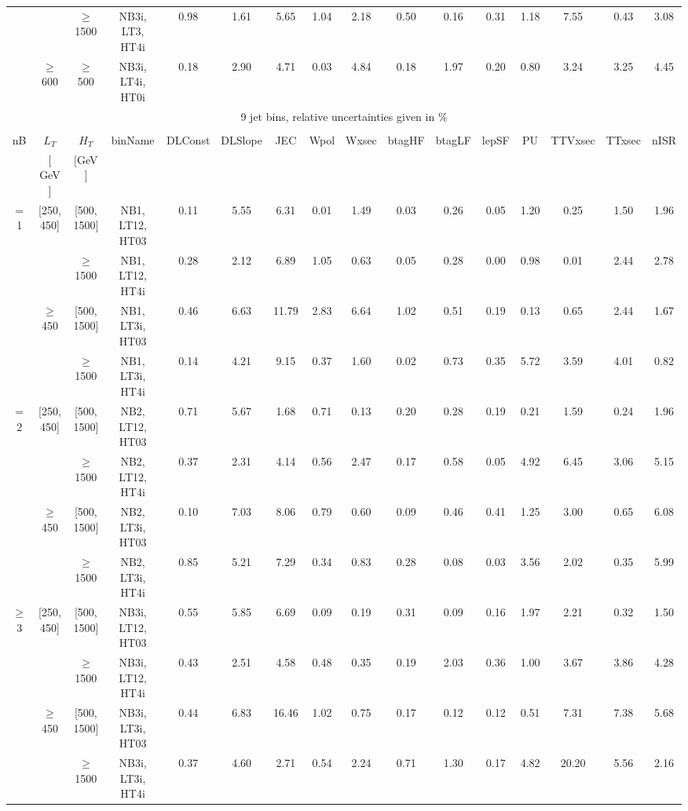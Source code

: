 \begin{sidewaystable}[ht]
\begin{center}
\begin{tabular}{|c | c | c | c | c | c | c | c | c | c | c | c | c | c | c | c | }
\cline{3-16}  & & $\geq$ 1500 &NB3i, LT3, HT4i & 0.98 & 1.61 & 5.65 & 1.04 & 2.18 & 0.50 & 0.16 & 0.31 & 1.18 & 7.55 & 0.43 & 3.08 \\ 
\cline{2-16}   & $\geq$ 600 & $\geq$ 500&NB3i, LT4i, HT0i & 0.18 & 2.90 & 4.71 & 0.03 & 4.84 & 0.18 & 1.97 & 0.20 & 0.80 & 3.24 & 3.25 & 4.45 \\ 
 \hline 
\multicolumn{16}{|c|}{9 jet bins, relative uncertainties given in \%} \\ 
\multicolumn{16}{|c|}{} \\ \hline 
nB &  $L_T$ & $H_T$ & binName & DLConst & DLSlope & JEC & Wpol & Wxsec & btagHF & btagLF & lepSF & PU & TTVxsec & TTxsec & nISR  \\ 
   & $[$ GeV $]$  &  $[$GeV$]$  &  &  &  &  &  &  &  &  &  &  &  &  &   \\ \hline 
\cline{1-16} $=$ 1 & [250, 450] & [500, 1500]&NB1, LT12, HT03 & 0.11 & 5.55 & 6.31 & 0.01 & 1.49 & 0.03 & 0.26 & 0.05 & 1.20 & 0.25 & 1.50 & 1.96 \\ 
\cline{3-16}  & & $\geq$ 1500 &NB1, LT12, HT4i & 0.28 & 2.12 & 6.89 & 1.05 & 0.63 & 0.05 & 0.28 & 0.00 & 0.98 & 0.01 & 2.44 & 2.78 \\ 
\cline{2-16}   & $\geq$ 450 & [500, 1500]&NB1, LT3i, HT03 & 0.46 & 6.63 & 11.79 & 2.83 & 6.64 & 1.02 & 0.51 & 0.19 & 0.13 & 0.65 & 2.44 & 1.67 \\ 
\cline{3-16}  & & $\geq$ 1500 &NB1, LT3i, HT4i & 0.14 & 4.21 & 9.15 & 0.37 & 1.60 & 0.02 & 0.73 & 0.35 & 5.72 & 3.59 & 4.01 & 0.82 \\ 
\cline{1-16} $=$ 2 & [250, 450] & [500, 1500]&NB2, LT12, HT03 & 0.71 & 5.67 & 1.68 & 0.71 & 0.13 & 0.20 & 0.28 & 0.19 & 0.21 & 1.59 & 0.24 & 1.96 \\ 
\cline{3-16}  & & $\geq$ 1500 &NB2, LT12, HT4i & 0.37 & 2.31 & 4.14 & 0.56 & 2.47 & 0.17 & 0.58 & 0.05 & 4.92 & 6.45 & 3.06 & 5.15 \\ 
\cline{2-16}   & $\geq$ 450 & [500, 1500]&NB2, LT3i, HT03 & 0.10 & 7.03 & 8.06 & 0.79 & 0.60 & 0.09 & 0.46 & 0.41 & 1.25 & 3.00 & 0.65 & 6.08 \\ 
\cline{3-16}  & & $\geq$ 1500 &NB2, LT3i, HT4i & 0.85 & 5.21 & 7.29 & 0.34 & 0.83 & 0.28 & 0.08 & 0.03 & 3.56 & 2.02 & 0.35 & 5.99 \\ 
\cline{1-16} $\geq$ 3 & [250, 450] & [500, 1500]&NB3i, LT12, HT03 & 0.55 & 5.85 & 6.69 & 0.09 & 0.19 & 0.31 & 0.09 & 0.16 & 1.97 & 2.21 & 0.32 & 1.50 \\ 
\cline{3-16}  & & $\geq$ 1500 &NB3i, LT12, HT4i & 0.43 & 2.51 & 4.58 & 0.48 & 0.35 & 0.19 & 2.03 & 0.36 & 1.00 & 3.67 & 3.86 & 4.28 \\ 
\cline{2-16}   & $\geq$ 450 & [500, 1500]&NB3i, LT3i, HT03 & 0.44 & 6.83 & 16.46 & 1.02 & 0.75 & 0.17 & 0.12 & 0.12 & 0.51 & 7.31 & 7.38 & 5.68 \\ 
\cline{3-16}  & & $\geq$ 1500 &NB3i, LT3i, HT4i & 0.37 & 4.60 & 2.71 & 0.54 & 2.24 & 0.71 & 1.30 & 0.17 & 4.82 & 20.20 & 5.56 & 2.16 \\ 
 \hline 
\hline 
\end{tabular} 
\end{center} 
\end{sidewaystable} 
 